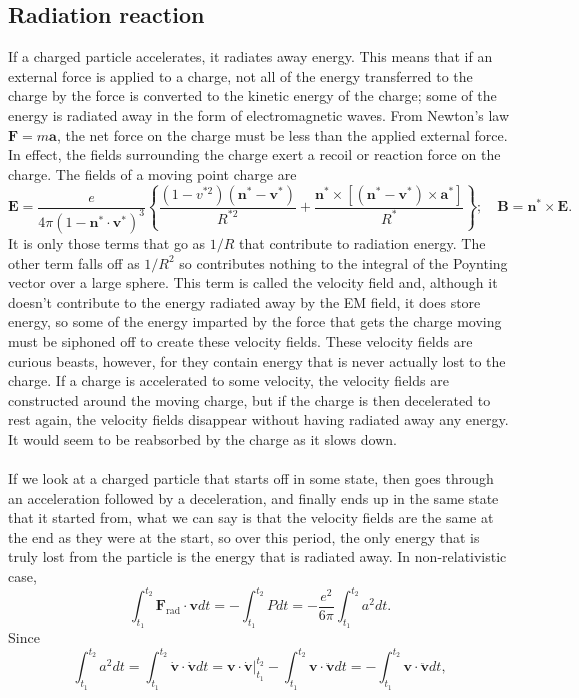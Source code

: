 \subsection{Radiation reaction}
If a charged particle accelerates, it radiates away energy. This means that if an external force is applied to a charge, not all of the energy transferred to the charge by the force is converted to the kinetic energy of the charge; some of the energy is radiated away in the form of electromagnetic waves.  From Newton's law $\bm{F}=m\bm{a}$, the net force on the charge must be less than the applied external force. In effect, the fields surrounding the charge exert a recoil or reaction force on the charge.
The fields of a moving point charge are
\[\bm{E} = \frac{e}{4\pi(1 - \bm{n}^* \cdot \bm{v}^*)^3} \left\{ \frac{(1-v^{*2})(\bm{n}^* - \bm{v}^*)}{R^{*2}} + \frac{\bm{n}^* \times \left[(\bm{n}^* - \bm{v}^*) \times \bm{a}^*\right]}{R^*} \right\}; \quad \bm{B} = \bm{n}^* \times \bm{E}.\]
It is only those terms that go as ${1}/{R}$ that contribute to radiation energy. The other term falls off as ${1}/{R^2}$ so contributes nothing to the integral of the Poynting vector over a large sphere. This term is called the velocity field and, although it doesn't contribute to the energy radiated away by the EM field, it does store energy, so some of the energy imparted by the force that gets the charge moving must be siphoned off to create these velocity fields. These velocity fields are curious beasts, however, for they contain energy that is never actually lost to the charge. If a charge is accelerated to some velocity, the velocity fields are constructed around the moving charge, but if the charge is then decelerated to rest again, the velocity fields disappear without having radiated away any energy. It would seem to be reabsorbed by the charge as it slows down. 
\\ \\
If we look at a charged particle that starts off in some state, then goes through an acceleration followed by a deceleration, and finally ends up in the same state that it started from, what we can say is that the velocity fields are the same at the end as they were at the start, so over this period, the only energy that is truly lost from the particle is the energy that is radiated away. In non-relativistic case,
\[\int_{t_{1}}^{t_{2}}\bm{F}_{\mathrm{rad}}\cdot\bm{v}dt = -\int_{t_{1}}^{t_{2}}Pdt = -\frac{e^{2}}{6\pi }\int_{t_{1}}^{t_{2}}a^{2}dt .\]
Since
\[\int_{t_{1}}^{t_{2}}a^{2}dt = \int_{t_{1}}^{t_{2}}\dot{\bm{v}}\cdot\dot{\bm{v}}dt = \bm{v}\cdot\dot{\bm{v}}|_{t_{1}}^{t_{2}}-\int_{t_{1}}^{t_{2}}\bm{v} \cdot\ddot{\bm{v}}dt = -\int_{t_{1}}^{t_{2}}\bm{v} \cdot\ddot{\bm{v}}dt,\]

